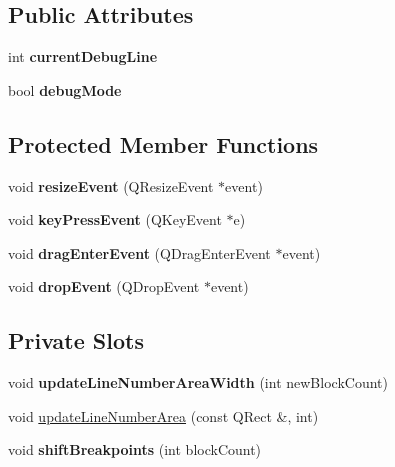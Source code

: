 \subsection*{Public Attributes}
\begin{DoxyCompactItemize}
\item 
\hypertarget{class_code_editor_a80d221047fe8770e4f44020d3dfdc211}{}int {\bfseries current\+Debug\+Line}\label{class_code_editor_a80d221047fe8770e4f44020d3dfdc211}

\item 
\hypertarget{class_code_editor_abfc08b4cdf3988f5325cb2bad954cc6a}{}bool {\bfseries debug\+Mode}\label{class_code_editor_abfc08b4cdf3988f5325cb2bad954cc6a}

\end{DoxyCompactItemize}
\subsection*{Protected Member Functions}
\begin{DoxyCompactItemize}
\item 
\hypertarget{class_code_editor_a3cf6c205d0cbcb3079811a406aab19be}{}void {\bfseries resize\+Event} (Q\+Resize\+Event $\ast$event)\label{class_code_editor_a3cf6c205d0cbcb3079811a406aab19be}

\item 
\hypertarget{class_code_editor_aa7addc3f760c1503bf8a2e57bb4b8678}{}void {\bfseries key\+Press\+Event} (Q\+Key\+Event $\ast$e)\label{class_code_editor_aa7addc3f760c1503bf8a2e57bb4b8678}

\item 
\hypertarget{class_code_editor_ae9ab9f58306591278621324da65bde40}{}void {\bfseries drag\+Enter\+Event} (Q\+Drag\+Enter\+Event $\ast$event)\label{class_code_editor_ae9ab9f58306591278621324da65bde40}

\item 
\hypertarget{class_code_editor_a4da88fc233cc1ff9cc96d08b7efd1033}{}void {\bfseries drop\+Event} (Q\+Drop\+Event $\ast$event)\label{class_code_editor_a4da88fc233cc1ff9cc96d08b7efd1033}

\end{DoxyCompactItemize}
\subsection*{Private Slots}
\begin{DoxyCompactItemize}
\item 
\hypertarget{class_code_editor_a28c8e8d686d9bacfb1bff04783b39924}{}void {\bfseries update\+Line\+Number\+Area\+Width} (int new\+Block\+Count)\label{class_code_editor_a28c8e8d686d9bacfb1bff04783b39924}

\item 
void \hyperlink{class_code_editor_a74597a5740a235410b56dfdd6f67314f}{update\+Line\+Number\+Area} (const Q\+Rect \&, int)
\item 
\hypertarget{class_code_editor_a0b95ac3b7c9fc3539f93b15fd3f3820e}{}void {\bfseries shift\+Breakpoints} (int block\+Count)\label{class_code_editor_a0b95ac3b7c9fc3539f93b15fd3f3820e}

\end{DoxyCompactItemize}

